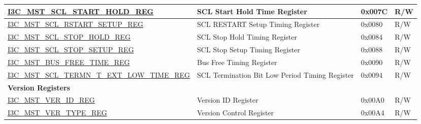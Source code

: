 \begin{longtable}{ | p{7.5cm} | p{6cm} | p{1.3cm} | p{1.5cm} | }
\hyperref[regdesc:I3CMSTSCLSTARTHOLDREG]{I3C\_MST\_SCL\_START\_HOLD\_REG} & SCL Start Hold Time Register & 0x007C & R/W \\ \hline
\hyperref[regdesc:I3CMSTSCLRSTARTSETUPREG]{I3C\_MST\_SCL\_RSTART\_SETUP\_REG} & SCL RESTART Setup Timing Register & 0x0080 & R/W \\ \hline
\hyperref[regdesc:I3CMSTSCLSTOPHOLDREG]{I3C\_MST\_SCL\_STOP\_HOLD\_REG} & SCL Stop Hold Timing Register & 0x0084 & R/W \\ \hline
\hyperref[regdesc:I3CMSTSCLSTOPSETUPREG]{I3C\_MST\_SCL\_STOP\_SETUP\_REG} & SCL Stop Setup Timing Register & 0x0088 & R/W \\ \hline
\hyperref[regdesc:I3CMSTBUSFREETIMEREG]{I3C\_MST\_BUS\_FREE\_TIME\_REG} & Bus Free Timing Register & 0x0090 & R/W \\ \hline
\hyperref[regdesc:I3CMSTSCLTERMNTEXTLOWTIMEREG]{I3C\_MST\_SCL\_TERMN\_T\_EXT\_LOW\_TIME\_REG} & SCL Termination Bit Low Period Timing Register & 0x0094 & R/W \\ \hline
\multicolumn{4}{|l|}{\textbf{Version Registers}} \\ \hline
\hyperref[regdesc:I3CMSTVERIDREG]{I3C\_MST\_VER\_ID\_REG} & Version ID Register & 0x00A0 & R/W \\ \hline
\hyperref[regdesc:I3CMSTVERTYPEREG]{I3C\_MST\_VER\_TYPE\_REG} & Version Control Register & 0x00A4 & R/W \\ \hline
\end{longtable}

